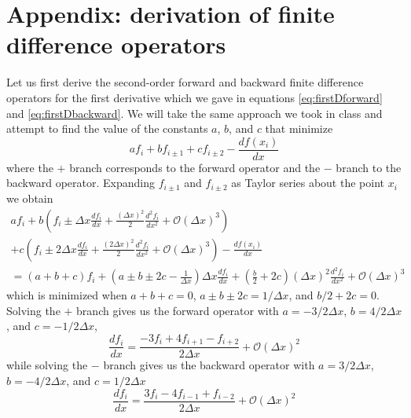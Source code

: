 \documentclass[11pt]{article}
\begin{document}
\section*{Appendix: derivation of finite difference operators}
Let us first derive the second-order forward and backward finite difference operators for the first derivative which we gave in equations \eqref{eq:firstDforward} and \eqref{eq:firstDbackward}. We will take the same approach we took in class and attempt to find the value of the constants $a$, $b$, and $c$ that minimize
\begin{displaymath}
  af_i + bf_{i\pm 1} + cf_{i\pm 2} - \frac{df(x_i)}{dx}
\end{displaymath}
where the $+$ branch corresponds to the forward operator and the $-$ branch to the backward operator. Expanding $f_{i\pm 1}$ and $f_{i\pm 2}$ as Taylor series about the point $x_i$ we obtain
\begin{multline*}
af_i
+ b\left( f_i \pm \Delta x \frac{df_i}{dx} + \frac{(\Delta x)^2}{2} \frac{d^2f_i}{dx^2} + \mathcal{O}(\Delta x)^3 \right) \\
+ c\left( f_i \pm 2\Delta x \frac{df_i}{dx} + \frac{(2\Delta x)^2}{2} \frac{d^2f_i}{dx^2} + \mathcal{O}(\Delta x)^3 \right) - \frac{df(x_i)}{dx} \\
= (a+b+c)f_i + \left( a \pm b \pm 2c - \frac{1}{\Delta x} \right) \Delta x \frac{df_i}{dx} + \left( \frac{b}{2} + 2c \right) (\Delta x)^2 \frac{d^2f_i}{dx^2} + \mathcal{O}(\Delta x)^3
\end{multline*}
which is minimized when $a+b+c=0$, $a \pm b \pm 2c = 1/\Delta x$, and $b/2 + 2c = 0$. Solving the $+$ branch gives us the forward operator with $a=-3/2\Delta x$, $b=4/2\Delta x$, and $c=-1/2\Delta x$,
\begin{equation}
\frac{df_i}{dx} = \frac{-3f_i + 4f_{i+1} - f_{i+2}}{2\Delta x} + \mathcal{O}(\Delta x)^2
\end{equation}
while solving the $-$ branch gives us the backward operator with $a=3/2\Delta x$, $b=-4/2\Delta x$, and $c=1/2\Delta x$
\begin{equation}
\frac{df_i}{dx} = \frac{3f_{i} - 4f_{i-1} + f_{i-2}}{2\Delta x} + \mathcal{O}(\Delta x)^2
\end{equation}
\end{document}
